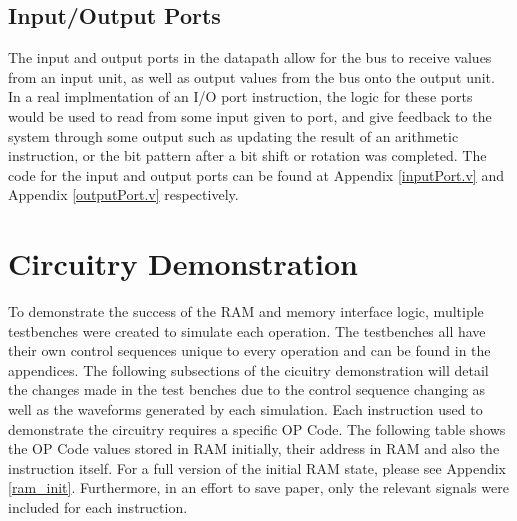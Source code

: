 \documentclass{article}
\begin{document}
    \subsection{Input/Output Ports}
    The input and output ports in the datapath allow for the bus to receive values from an input unit, as well as output values from the bus onto the output unit. In a real implmentation of an I/O port instruction, the logic for these ports would be used to read from some input given to port, and give feedback to the system through some output such as updating the result of an arithmetic instruction, or the bit pattern after a bit shift or rotation was completed. The code for the input and output ports can be found at Appendix \ref{inputPort.v} and Appendix \ref{outputPort.v} respectively.

\section{Circuitry Demonstration}
    To demonstrate the success of the RAM and memory interface logic, multiple testbenches were created to simulate each operation.  The testbenches all have their own control sequences unique to every operation and can be found in the appendices. The following subsections of the cicuitry demonstration will detail the changes made in the test benches due to the control sequence changing as well as the waveforms generated by each simulation. Each instruction used to demonstrate the circuitry requires a specific OP Code. The following table shows the OP Code values stored in RAM initially, their address in RAM and also the instruction itself. For a full version of the initial RAM state, please see Appendix \ref{ram_init}. Furthermore, in an effort to save paper, only the relevant signals were included for each instruction.
\end{document}
